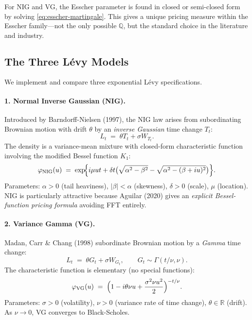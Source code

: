 \documentclass[12pt, a4paper]{article}
\begin{document}
For NIG and VG, the Esscher parameter is found in closed or semi-closed form by solving \eqref{eq:esscher-martingale}. This gives a unique pricing measure within the Esscher family---not the only possible $\mathbb{Q}$, but the standard choice in the literature and industry.

\subsection{The Three L\'evy Models}
\label{subsec:three-levy}

We implement and compare three exponential L\'evy specifications.

\paragraph{1. Normal Inverse Gaussian (NIG).}
Introduced by Barndorff-Nielsen (1997), the NIG law arises from subordinating Brownian motion with drift $\theta$ by an \emph{inverse Gaussian} time change $T_t$:
\begin{equation}
L_t \;=\; \theta T_t + \sigma W_{T_t}.
\end{equation}
The density is a variance-mean mixture with closed-form characteristic function involving the modified Bessel function $K_1$:
\begin{equation}
\varphi_{\text{NIG}}(u) \;=\;
\exp\!\Bigl\{ i\mu u t + \delta t\bigl(\sqrt{\alpha^2 - \beta^2} - \sqrt{\alpha^2 - (\beta+iu)^2}\bigr)\Bigr\}.
\end{equation}
Parameters: $\alpha > 0$ (tail heaviness), $|\beta| < \alpha$ (skewness), $\delta > 0$ (scale), $\mu$ (location). NIG is particularly attractive because Aguilar (2020) gives an \emph{explicit Bessel-function pricing formula} avoiding FFT entirely.

\paragraph{2. Variance Gamma (VG).}
Madan, Carr \& Chang (1998) subordinate Brownian motion by a \emph{Gamma} time change:
\begin{equation}
L_t \;=\; \theta G_t + \sigma W_{G_t}, \qquad G_t \sim \Gamma(t/\nu, \nu).
\end{equation}
The characteristic function is elementary (no special functions):
\begin{equation}
\varphi_{\text{VG}}(u) \;=\;
\Bigl(1 - i\theta\nu u + \frac{\sigma^2\nu u^2}{2}\Bigr)^{-t/\nu}.
\end{equation}
Parameters: $\sigma > 0$ (volatility), $\nu > 0$ (variance rate of time change), $\theta \in \mathbb{R}$ (drift). As $\nu \to 0$, VG converges to Black-Scholes.
\end{document}
